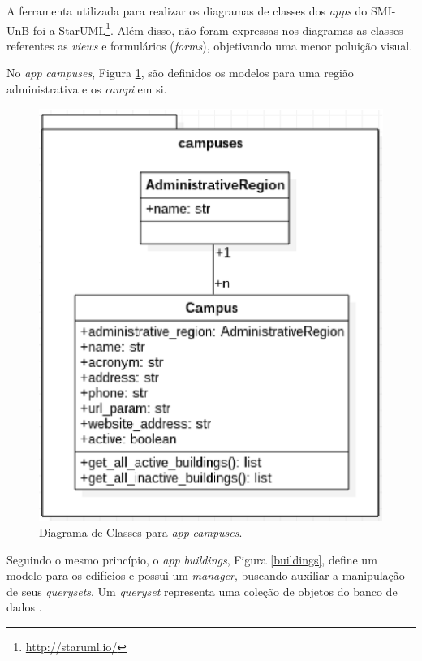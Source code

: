 A ferramenta utilizada para realizar os diagramas de classes dos \textit{apps} do SMI-UnB foi a StarUML\footnote{\url{http://staruml.io/}}. Além disso, não foram expressas nos diagramas as classes referentes as \textit{views} e formulários (\textit{forms}), objetivando uma menor poluição visual.

No \textit{app} \textit{campuses}, Figura \ref{campuses}, são definidos os modelos para uma região administrativa e os \textit{campi} em si.

\begin{figure}[!h]
    \centering
    \includegraphics[keepaspectratio=true,scale=0.8]{figuras/campuses.eps}
    \caption{Diagrama de Classes para \textit{app} \textit{campuses}.}
    \label{campuses}
\end{figure}

Seguindo o mesmo princípio, o \textit{app} \textit{buildings}, Figura \ref{buildings}, define um modelo para os edifícios e possui um \textit{manager}, buscando auxiliar a manipulação de seus \textit{querysets}. Um \textit{queryset} representa uma coleção de objetos do banco de dados \cite{django_project}.

